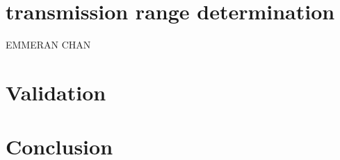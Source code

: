 \documentclass[conference]{IEEEtran}
\begin{document}
\section{transmission range determination}
EMMERAN CHAN

\section{Validation}

\section{Conclusion}


\vspace{12pt}
\end{document}
